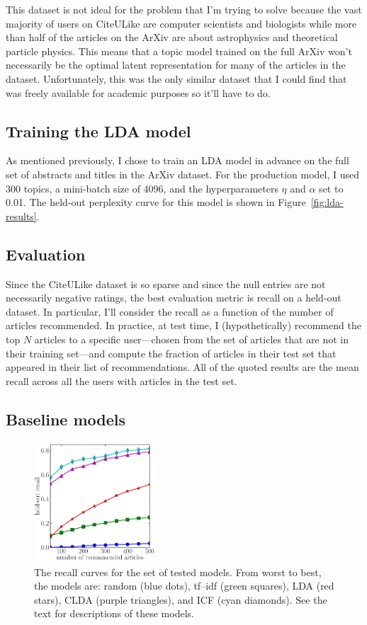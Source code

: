 \documentclass[11pt]{article}
\newcommand{\fig}[1]{Figure~\ref{fig:#1}}
\newcommand{\figlabel}[1]{\label{fig:#1}}
\begin{document}
This dataset is not ideal for the problem that I'm trying to solve because the
vast majority of users on CiteULike are computer scientists and biologists
while more than half of the articles on the ArXiv are about astrophysics and
theoretical particle physics.
This means that a topic model trained on the full ArXiv won't necessarily be
the optimal latent representation for many of the articles in the dataset.
Unfortunately, this was the only similar dataset that I could find that was
freely available for academic purposes so it'll have to do.

\subsection{Training the LDA model}

As mentioned previously, I chose to train an LDA model in advance on the full
set of abstracts and titles in the ArXiv dataset.
For the production model, I used 300 topics, a mini-batch size of 4096, and
the hyperparameters $\eta$ and $\alpha$ set to 0.01.
The held-out perplexity curve for this model is shown in \fig{lda-results}.

\subsection{Evaluation}

Since the CiteULike dataset is so sparse and since the null entries are not
necessarily negative ratings, the best evaluation metric is recall on a
held-out dataset.
In particular, I'll consider the recall as a function of the number of
articles recommended.
In practice, at test time, I (hypothetically) recommend the top $N$ articles
to a specific user---chosen from the set of articles that are not in their
training set---and compute the fraction of articles in their test set that
appeared in their list of recommendations.
All of the quoted results are the mean recall across all the users with
articles in the test set.

\subsection{Baseline models}

\begin{figure}
\centering
\includegraphics[width=0.4\textwidth]{results.pdf}
\caption{%
The recall curves for the set of tested models.
From worst to best, the models are: random (blue dots), tf--idf (green
squares), LDA (red stars), CLDA (purple triangles), and ICF (cyan diamonds).
See the text for descriptions of these models.
\figlabel{results}}
\end{figure}
\end{document}
